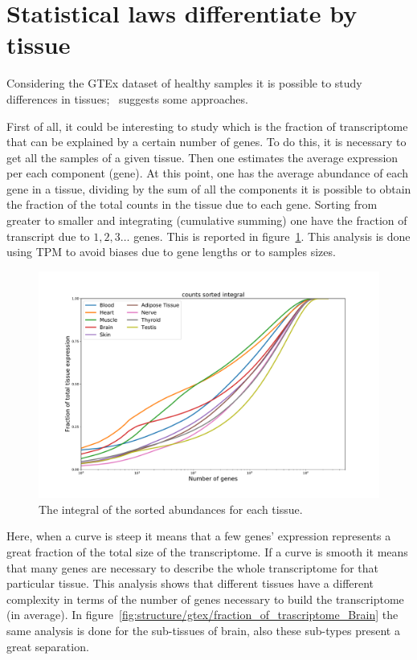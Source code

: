 \section{Statistical laws differentiate by tissue}
Considering the GTEx dataset of healthy samples it is possible to study differences in tissues;~\cite{mele2014} suggests some approaches.

First of all, it could be interesting to study which is the fraction of transcriptome that can be explained by a certain number of genes.
To do this, it is necessary to get all the samples of a given tissue. Then one estimates the average expression per each component (gene). At this point, one has the average abundance of each gene in a tissue, dividing by the sum of all the components it is possible to obtain the fraction of the total counts in the tissue due to each gene. Sorting from greater to smaller and integrating (cumulative summing) one have the fraction of transcript due to $1, 2, 3\dots$ genes. This is reported in figure~\ref{fig:structure/gtex/fraction_of_trascriptome}. This analysis is done using TPM to avoid biases due to gene lengths or to samples sizes.
\begin{figure}[htb!]
  \centering
  \includegraphics[width=0.7\linewidth]{pictures/structure/gtex/fraction_of_trascriptome.pdf}
  \caption{The integral of the sorted abundances for each tissue.}
  \label{fig:structure/gtex/fraction_of_trascriptome}
\end{figure}
\FloatBarrier
Here, when a curve is steep it means that a few genes' expression represents a great fraction of the total size of the transcriptome. If a curve is smooth it means that many genes are necessary to describe the whole transcriptome for that particular tissue. This analysis shows that different tissues have a different complexity in terms of the number of genes necessary to build the transcriptome (in average). In figure~\ref{fig:structure/gtex/fraction_of_trascriptome_Brain} the same analysis is done for the sub-tissues of brain, also these sub-types present a great separation.
